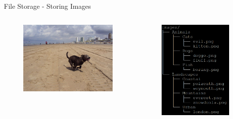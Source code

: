 \begin{frame}{File Storage - Storing Images}
\begin{columns}
    \begin{column}{0.47\textwidth}
    \begin{figure}
        \centering
        \includegraphics[width=\textwidth,height=0.45\textheight,keepaspectratio]{img/dog-or-beach.jpg}
        \label{fig:my_label}
    \end{figure}
    \end{column}
    \begin{column}{0.47\textwidth}
    \begin{figure}
        \centering
        \includegraphics[width=\textwidth,height=0.55\textheight,keepaspectratio]{img/image-tree.png}

\end{figure}
\end{column}
\end{columns}
\end{frame}

